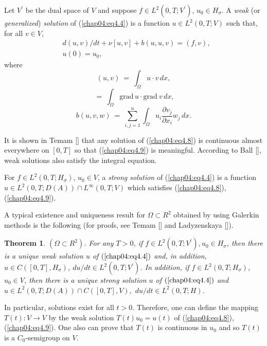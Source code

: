 \documentclass{surv-l}
\theoremstyle{plain}
\newtheorem{theorem}{Theorem}[section]
\theoremstyle{definition}
\numberwithin{equation}{section}
\numberwithin{figure}{chapter}
\begin{document}
Let $V^{\prime}$ be the dual space of $V$ and suppose $f\in L^{2}(0, T; V^{\prime})$, $u_{0}\in H_{\sigma}$. A \emph{weak} (or \emph{generalized}) \emph{solution} of (\ref{chap04:eq4.4}) is a function $u\in L^{2}(0, T; V)$ such that, for all $v \in V$,
\begin{align}\label{chap04:eq4.8}
&d(u, v)/dt+ \nu [u, v]+ b(u,u,v)=(f, v),\\
&u(0)=u_{0},\label{chap04:eq4.9}
\end{align}
where
\begin{equation*}
(u, v)\ =\ \int_{\Omega}u\cdot v\, dx,
\end{equation*}
\begin{equation*}
[u, v]\ =\ \int_{\Omega} \mathrm{grad}\, u \cdot \mathrm{grad}\ v\, dx,
\end{equation*}
\begin{equation*}
b(u, v, w)\ =\ \sum_{i,j=1}^{n}\int_{\Omega}u_{i}\frac{\partial v_{j}}{\partial x_{i}}w_{j}\, dx.
\end{equation*}

It is shown in Temam [\citeyear{1983t}] that any solution of (\ref{chap04:eq4.8}) is continuous almost everywhere on $[0, T]$ so that (\ref{chap04:eq4.9}) is meaningful. According to Ball [\citeyear{1976b}], weak solutions also satisfy the integral equation.

For $f\in L^{2}(0, T; H_{\sigma})$, $u_{0}\in V$, a \emph{strong solution} of (\ref{chap04:eq4.4}) is a function $ u\in L^{2}(0, T; D(A))\cap L^{\infty}(0, T; V)$ which satisfies (\ref{chap04:eq4.8}), (\ref{chap04:eq4.9}).

A typical existence and uniqueness result for $\Omega \subset R^{2}$ obtained by using Galerkin methods is the following (for proofs, see Temam [\citeyear{1983t}] and Ladyzenskaya [\citeyear{1963l}]).

\begin{theorem}\label{thm4.4.3} $(\Omega\subset R^{2})$. For any $T>0$, if $f\in L^{2}(0, T; V^{\prime}),u_{0}\in H_{\sigma}$, then there is a unique weak solution $u$ of $(\ref{chap04:eq4.4})$ and, in addition, $u\in C([0, T], H_{\sigma})$, $du/dt\in L^{2}(0, T; V^{\prime})$. In addition, if $f\in L^{2}(0, T; H_{\sigma})$, $u_{0}\in V$, then there is a unique strong solution $u$ of $(\ref{chap04:eq4.4})$ and $u\in L^{2}(0, T; D(A))\cap C([0, T], V),$ $du/dt\in L^{2}(0, T; H)$.
\end{theorem}

In particular, solutions exist for all $t>0$. Therefore, one can define the mapping $T(t):V\rightarrow V$ by the weak solution $T(t)u_{0}=u(t)$ of (\ref{chap04:eq4.8}), (\ref{chap04:eq4.9}). One also can prove that $T(t)$ is continuous in $u_{0}$ and so $T(t)$ is a $C_{0}$-semigroup on $V$.
\end{document}
